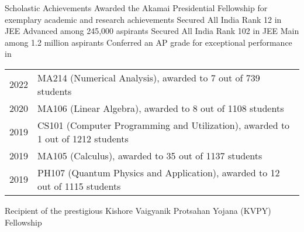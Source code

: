 
\begin{rubric}{Scholastic Achievements}
    \entry*[2023] Awarded the Akamai Presidential Fellowship for exemplary academic and research achievements
    \entry*[2019] Secured All India Rank 12 in JEE Advanced among 245,000 aspirants
    \entry*[2019\phantom{}] Secured All India Rank 102 in JEE Main among 1.2 million aspirants
    \entry* Conferred an AP grade for exceptional performance in
        
        \begin{tabular}{@{}ll}
           2022 & MA214 (Numerical Analysis), awarded to 7 out of 739 students \\
           2020 & MA106 (Linear Algebra), awarded to 8 out of 1108 students \\
           2019 & CS101 (Computer Programming and Utilization), awarded to 1 out of 1212 students \\
           2019 & MA105 (Calculus), awarded to 35 out of 1137 students \\
           2019 & PH107 (Quantum Physics and Application), awarded to 12 out of 1115 students \\
        \end{tabular}
    \entry*[2017] Recipient of the prestigious Kishore Vaigyanik Protsahan Yojana (KVPY) Fellowship 
\end{rubric}